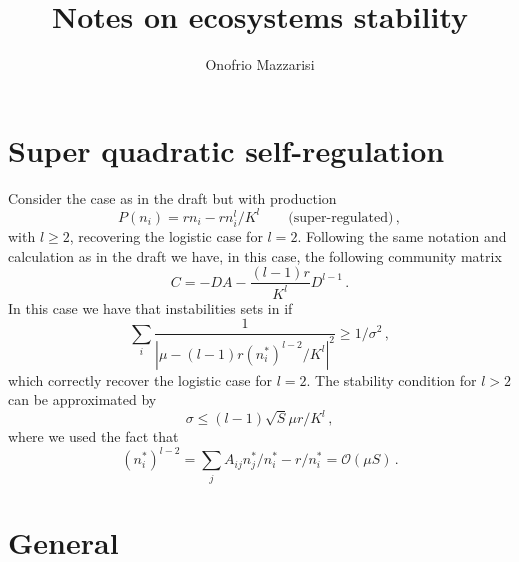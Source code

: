 \documentclass[10pt]{article}
\title{{\bf Notes on ecosystems stability}}
\author{Onofrio Mazzarisi}
\begin{document}


\maketitle

\section{Super quadratic self-regulation}
Consider the case as in the draft but with production 
\begin{equation}
    P(n_i) = rn_i - rn_i^l/K^l \qquad \textrm{(super-regulated)} \, ,
\end{equation}
with $l\geq 2$, recovering the logistic case for $l=2$.
Following the same notation and calculation as in the draft we have,
in this case, the following community matrix
\begin{equation}
   C =  -DA -\frac{(l-1)r}{K^l}D^{l-1} \, .
\end{equation}
In this case we have that instabilities sets in if
\begin{equation}
    \sum_i \frac{1}{|\mu -(l-1)r(n_i^*)^{l-2}/K^l|^2}\geq 1/\sigma^2 \, ,
\end{equation}
which correctly recover the logistic case for $l=2$.
The stability condition for $l>2$ can be approximated by
\begin{equation}
    \sigma \leq (l-1)\sqrt{S}\mu r/K^l \, ,
\end{equation}
where we used the fact that
\begin{equation}
    (n_i^*)^{l-2} = \sum_j A_{ij}n_j^*/n_i^* - r/n_i^* = \mathcal{O}(\mu S) \, .
\end{equation}

\section{General}
\end{document}
